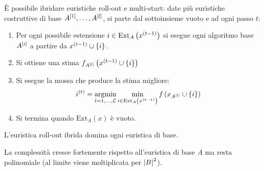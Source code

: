 \documentclass[\main/main.tex]{subfiles}
\providecommand{\Ext}{\text{Ext}_A}
\begin{document}
\begin{multicols}{2}
\begin{observation}
    È possibile ibridare euristiche roll-out e multi-start: date più euristiche costruttive di base \(A^{\left[1\right]}, \ldots, A^{\left[l\right]}\), si parte dal sottoinsieme vuoto e ad ogni passo \(t\):
    \begin{enumerate}
        \item Per ogni possibile estensione \(i \in \Ext\rnd{x^{(t-1)}}\) si esegue ogni algoritmo base \(A^{\left[i\right]}\) a partire da \(x^{\left(t-1\right)} \cup \left\{i\right\}\).
        \item Si ottiene una stima \(f_{A^{\left[l\right]}}\left(x^{\left(t-1\right)} \cup \left\{i\right\}\right)\)
        \item Si esegue la mossa che produce la stima migliore:
        \[
            i^{\rnd{t}} = \argmin_{l = 1,\ldots,\mathcal{L}}\min_{i \in \Ext\rnd{x^{\rnd{t-1}}}} f\rnd{x_{A^{\sqr{l}}} \cup \crl{i}}
        \]
        \item Si termina quando \(\Ext(x)\) è vuoto.
    \end{enumerate}
    
    L'euristica roll-out ibrida domina ogni euristica di base.
    
    La complessità cresce fortemente rispetto all'euristica di base \(A\) ma resta polinomiale (al limite viene moltiplicata per \(\left\lvert B\right\rvert^2\)).
\end{observation}
\end{multicols}
\end{document}
